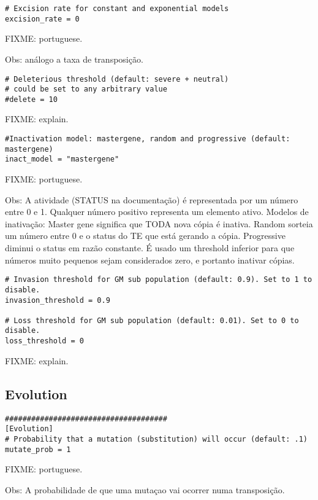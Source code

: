 \documentclass[10pt]{article}
\begin{document}
\begin{verbatim}
# Excision rate for constant and exponential models
excision_rate = 0
\end{verbatim}

FIXME: portuguese.

Obs: análogo a taxa de transposição.

\begin{verbatim}
# Deleterious threshold (default: severe + neutral)
# could be set to any arbitrary value
#delete = 10
\end{verbatim}

FIXME: explain.

\begin{verbatim}
#Inactivation model: mastergene, random and progressive (default: mastergene)
inact_model = "mastergene"
\end{verbatim}

FIXME: portuguese.

Obs: A atividade (STATUS na documentação) é representada por um número
entre 0 e 1. Qualquer número positivo representa um elemento
ativo. Modelos de inativação: Master gene significa que TODA nova
cópia é inativa. Random sorteia um número entre 0 e o status do TE que
está gerando a cópia. Progressive diminui o status em razão
constante. É usado um threshold inferior para que números muito
pequenos sejam considerados zero, e portanto inativar cópias.


\begin{verbatim}
# Invasion threshold for GM sub population (default: 0.9). Set to 1 to disable.
invasion_threshold = 0.9

# Loss threshold for GM sub population (default: 0.01). Set to 0 to disable.
loss_threshold = 0
\end{verbatim}

FIXME: explain.

\subsection{Evolution}
\label{sec:default_config_evolution}

\begin{verbatim}
#####################################
[Evolution]
# Probability that a mutation (substitution) will occur (default: .1)
mutate_prob = 1
\end{verbatim}

FIXME: portuguese.

Obs: A probabilidade de que uma mutaçao vai ocorrer numa transposição.
\end{document}
